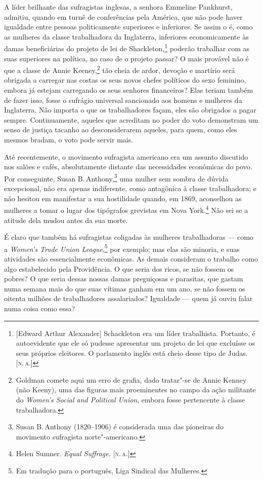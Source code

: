 A líder brilhante das sufragistas inglesas, a senhora Emmeline
Pankhurst, admitiu, quando em turnê de conferências pela América, que não
pode haver igualdade entre pessoas politicamente superiores e
inferiores. Se assim o é, como as mulheres da classe trabalhadora da
Inglaterra, inferiores economicamente às damas beneficiárias do projeto
de lei de Shackleton,\footnote{{[}Edward Arthur Alexander{]} Schackleton
  era um líder trabalhista. Portanto, é autoevidente que ele só pudesse
  apresentar um projeto de lei que excluísse os seus próprios eleitores.
  O parlamento inglês está cheio desse tipo de Judas. [\textsc{n.\,a.}]} poderão
trabalhar com as suas superiores na política, no caso de o projeto passar? 
O mais provável não é que a classe de Annie Keeney,\footnote{Goldman comete aqui um
  erro de grafia, dado tratar"-se de Annie Kenney (não Keeny), uma das
  figuras mais proeminentes no campo da ação militante do \emph{Women's
  Social and Political Union}, embora fosse pertencente à classe
  trabalhadora.} tão cheia de ardor, devoção e martírio será obrigada a
carregar nas costas os seus novos chefes políticos do sexo feminino, embora já
estejam carregando os seus senhores financeiros? Elas teriam também de
fazer isso, fosse o sufrágio universal sancionado aos homens e mulheres da
Inglaterra. Não importa o que os trabalhadores façam, eles são obrigados
a pagar sempre. Continuamente, aqueles que acreditam no poder do voto
demonstram um senso de justiça tacanho ao desconsiderarem aqueles, para
quem, como eles mesmos bradam, o voto pode servir mais.

Até recentemente, o movimento sufragista americano era um assunto
discutido nos salões e cafés, absolutamente distante das necessidades
econômicas do povo. Por conseguinte, Susan B.\,Anthony,\footnote{Susan B.\,Anthony (1820--1906) é considerada uma das pioneiras do movimento sufragista norte"-americano.} uma mulher sem
sombra de dúvida excepcional, não era apenas indiferente, como
antagônica à classe trabalhadora; e não hesitou em manifestar a sua
hostilidade quando, em 1869, aconselhou as mulheres a tomar o lugar dos
tipógrafos grevistas em Nova York.\footnote{Helen Sumner. \emph{Equal
  Suffrage.} [\textsc{n.\,a.}]} Não sei se a atitude dela mudou antes da sua morte.

É claro que também há sufragistas coligadas às mulheres trabalhadoras
--- como a \emph{Women's Trade Union League},\footnote{Em tradução para o português, Liga Sindical das
Mulheres.} por exemplo; mas elas são minoria, e suas atividades
são essencialmente econômicas. As demais consideram o trabalho como algo
estabelecido pela Providência. O que seria dos ricos, se não fossem
os pobres? O que seria dessas nossas damas preguiçosas e parasitas, que
gastam numa semana mais do que suas vítimas ganham em um ano, se não
fossem os oitenta milhões de trabalhadores assalariados? Igualdade --- quem já ouviu falar numa coisa como essa?

